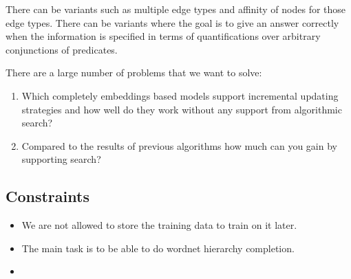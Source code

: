 \documentclass[11pt]{article}
\begin{document}
There can be variants such as multiple edge types and affinity of
nodes for those edge types. There can be variants where the goal is to
give an answer correctly when the information is specified in terms of
quantifications over arbitrary conjunctions of predicates.

There are a large number of problems that we want to solve:

\begin{enumerate}
\item Which completely embeddings based models support incremental
  updating strategies and how well do they work without any support
  from algorithmic search?
\item Compared to the results of previous algorithms how much can you
  gain by supporting search?
\end{enumerate}

\subsection{Constraints}
\label{sec:constraints}

\begin{itemize}
\item We are not allowed to store the training data to train on it later.
\item The main task is to be able to do wordnet hierarchy completion.
\item
\end{itemize}





\end{document}
